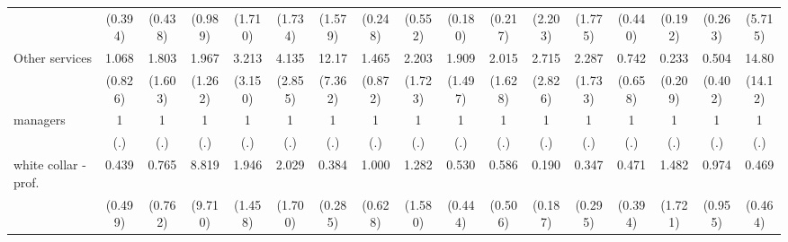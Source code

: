 {\begin{tabular}{l*{16}{c}}
                    &     (0.394)         &     (0.438)         &     (0.989)         &     (1.710)         &     (1.734)         &     (1.579)         &     (0.248)         &     (0.552)         &     (0.180)         &     (0.217)         &     (2.203)         &     (1.775)         &     (0.440)         &     (0.192)         &     (0.263)         &     (5.715)         \\
[1em]
Other services      &       1.068         &       1.803         &       1.967         &       3.213         &       4.135\sym{*}  &       12.17\sym{***}&       1.465         &       2.203         &       1.909         &       2.015         &       2.715         &       2.287         &       0.742         &       0.233         &       0.504         &       14.80\sym{**} \\
                    &     (0.826)         &     (1.603)         &     (1.262)         &     (3.150)         &     (2.855)         &     (7.362)         &     (0.872)         &     (1.723)         &     (1.497)         &     (1.628)         &     (2.826)         &     (1.733)         &     (0.658)         &     (0.209)         &     (0.402)         &     (14.12)         \\
[1em]
managers            &           1         &           1         &           1         &           1         &           1         &           1         &           1         &           1         &           1         &           1         &           1         &           1         &           1         &           1         &           1         &           1         \\
                    &         (.)         &         (.)         &         (.)         &         (.)         &         (.)         &         (.)         &         (.)         &         (.)         &         (.)         &         (.)         &         (.)         &         (.)         &         (.)         &         (.)         &         (.)         &         (.)         \\
[1em]
white collar - prof.&       0.439         &       0.765         &       8.819\sym{*}  &       1.946         &       2.029         &       0.384         &       1.000         &       1.282         &       0.530         &       0.586         &       0.190         &       0.347         &       0.471         &       1.482         &       0.974         &       0.469         \\
                    &     (0.499)         &     (0.762)         &     (9.710)         &     (1.458)         &     (1.700)         &     (0.285)         &     (0.628)         &     (1.580)         &     (0.444)         &     (0.506)         &     (0.187)         &     (0.295)         &     (0.394)         &     (1.721)         &     (0.955)         &     (0.464)         \\

\end{tabular}}
